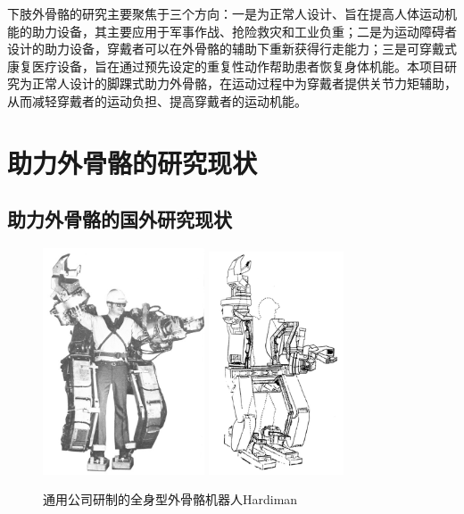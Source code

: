 下肢外骨骼的研究主要聚焦于三个方向：一是为正常人设计、旨在提高人体运动机能的助力设备，其主要应用于军事作战、抢险救灾和工业负重；二是为运动障碍者设计的助力设备，穿戴者可以在外骨骼的辅助下重新获得行走能力；三是可穿戴式康复医疗设备，旨在通过预先设定的重复性动作帮助患者恢复身体机能。本项目研究为正常人设计的脚踝式助力外骨骼，在运动过程中为穿戴者提供关节力矩辅助，从而减轻穿戴者的运动负担、提高穿戴者的运动机能。

\section{助力外骨骼的研究现状}

\subsection{助力外骨骼的国外研究现状}

\begin{figure}[!h]
    \label{fig:sub1}{\includegraphics[width=4.8cm]{fig/f3_Hardiman.jpg}}\quad
    \label{fig:sub2}{\includegraphics[width=4cm]{fig/f4_Hardiman.jpg}}
    \caption{通用公司研制的全身型外骨骼机器人Hardiman\cite{p6}}
    \label{fig:subfigs}
\end{figure}

